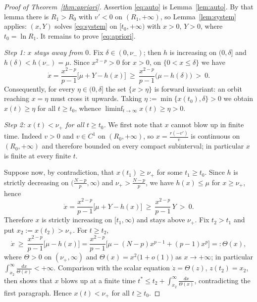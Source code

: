 \documentclass[11pt,reqno]{amsart}
\numberwithin{equation}{section}
\theoremstyle{plain}
\theoremstyle{definition}
\begin{document}
\begin{proof}[Proof of Theorem~\ref{thm:apriori}]
Assertion \eqref{eq:auto} is Lemma~\ref{lem:auto}. By that lemma there is
$R_{1}>R_{0}$ with $v'<0$ on $(R_{1},+\infty)$, so Lemma~\ref{lem:system}
applies: $(x,Y)$ solves \eqref{eq:system} on $[t_{0},+\infty)$ with $x>0$,
$Y>0$, where $t_{0}=\ln R_{1}$. It remains to prove \eqref{eq:apriori}.

\smallskip
\noindent\emph{Step 1: $x$ stays away from $0$.} Fix $\delta\in(0,\nu_{-})$;
then $h$ is increasing on $(0,\delta]$ and $h(\delta)<h(\nu_{-})=\mu$. Since
$x^{2-p}>0$ for $x>0$, on $\{0<x\le\delta\}$ we have
\[
\dot x=\frac{x^{2-p}}{p-1}\big[\mu+Y-h(x)\big]
\ \ge\ \frac{x^{2-p}}{p-1}\big(\mu-h(\delta)\big)\ >\ 0 .
\]
Consequently, for every $\eta\in(0,\delta]$ the set $\{x>\eta\}$ is forward
invariant: an orbit reaching $x=\eta$ must cross it upwards. Taking
$\eta:=\min\{x(t_{0}),\delta\}>0$ we obtain $x(t)\ge\eta$ for all $t\ge t_{0}$,
whence $\liminf_{t\to\infty}x(t)\ge\eta>0$.

\smallskip
\noindent\emph{Step 2: $x(t)<\nu_{+}$ for all $t\ge t_{0}$.} We first note that
$x$ cannot blow up in finite time. Indeed $v>0$ and $v\in C^{1}$ on
$(R_{0},+\infty)$, so $x=\frac{r(-v')}{v}$ is continuous on
$(R_{0},+\infty)$ and therefore bounded on every compact subinterval; in
particular $x$ is finite at every finite $t$.

Suppose now, by contradiction, that $x(t_{1})\ge\nu_{+}$ for some
$t_{1}\ge t_{0}$. Since $h$ is strictly decreasing on
$\big(\frac{N-p}{p},\infty\big)$ and $\nu_{+}>\frac{N-p}{p}$, we have
$h(x)\le\mu$ for $x\ge\nu_{+}$, hence
\[
\dot x=\frac{x^{2-p}}{p-1}\big[\mu+Y-h(x)\big]
\ \ge\ \frac{x^{2-p}}{p-1}\,Y\ >\ 0 .
\]
Therefore $x$ is strictly increasing on $[t_{1},\infty)$ and stays above
$\nu_{+}$. Fix $t_{2}>t_{1}$ and put $x_{2}:=x(t_{2})>\nu_{+}$. For
$t\ge t_{2}$,
\[
\dot x\ \ge\ \frac{x^{2-p}}{p-1}\big[\mu-h(x)\big]
=\frac{x^{2-p}}{p-1}\Big[\mu-(N-p)x^{p-1}+(p-1)x^{p}\Big]=:\Theta(x) ,
\]
where $\Theta>0$ on $(\nu_{+},\infty)$ and $\Theta(x)=x^{2}\big(1+o(1)\big)$ as
$x\to+\infty$; in particular
$\int_{x_{2}}^{\infty}\frac{dx}{\Theta(x)}<+\infty$. Comparison with the
scalar equation $\dot z=\Theta(z)$, $z(t_{2})=x_{2}$, then shows that $x$
blows up at a finite time
$t^{*}\le t_{2}+\int_{x_{2}}^{\infty}\frac{dx}{\Theta(x)}$, contradicting the
first paragraph. Hence $x(t)<\nu_{+}$ for all $t\ge t_{0}$.


\end{proof}
\end{document}
